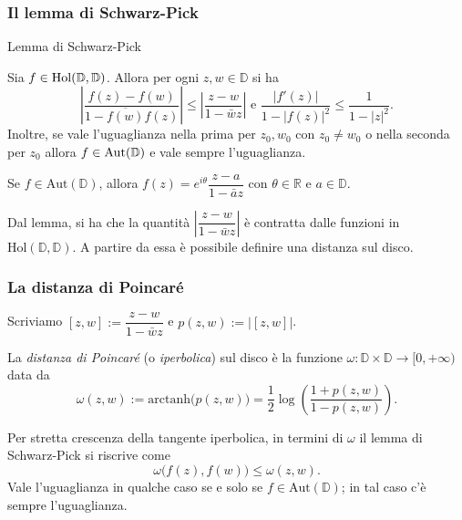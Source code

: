 \begin{frame}
  \frametitle{Il lemma di Schwarz-Pick}
  \begin{block}{Lemma di Schwarz-Pick} \label{SP}
    \begin{itshape}
      Sia $f \in \text{\normalfont{Hol}}(\mathbb{D},\mathbb{D})$. Allora per ogni $z, w \in \mathbb{D}$ si ha
      $$\left|\frac{f(z)-f(w)}{1-\overline{f(w)}f(z)}\right| \le \left|\frac{z-w}{1-\bar{w}z}\right| \text{ e } \frac{|f'(z)|}{1-|f(z)|^2} \le \frac{1}{1-|z|^2}.$$
      Inoltre, se vale l'uguaglianza nella prima per $z_0, w_0$ con $z_0 \not=w_0$ o nella seconda per $z_0$ allora $f \in \text{\normalfont{Aut}}(\mathbb{D})$ e vale sempre l'uguaglianza.
    \end{itshape}
  \end{block}
  \pause
  \begin{oss}
    Se $f \in \text{Aut}(\mathbb{D})$, allora $f(z)=e^{i\theta}\dfrac{z-a}{1-\bar{a}z}$ con $\theta \in \mathbb{R}$ e $a \in \mathbb{D}$.
  \end{oss}
  \pause
  Dal lemma, si ha che la quantità $\left|\dfrac{z-w}{1-\bar{w}z}\right|$ è contratta dalle funzioni in $\text{Hol}(\mathbb{D},\mathbb{D})$. A partire da essa è possibile definire una distanza sul disco.
\end{frame}

\begin{frame}
  \frametitle{La distanza di Poincaré}
  Scriviamo $[z,w]:=\dfrac{z-w}{1-\bar{w}z}$ e $p(z,w):=|[z,w]|$. \pause
  \begin{defn}
    La \textit{distanza di Poincaré} (o \textit{iperbolica}) sul disco è la funzione $\omega:\mathbb{D}\times \mathbb{D} \longrightarrow [0,+\infty)$ data da
    $$\omega(z,w):=\text{arctanh}\bigl(p(z,w)\bigr)=\frac{1}{2}\log\left(\frac{1+p(z,w)}{1-p(z,w)}\right).$$
  \end{defn}
  \pause
  Per stretta crescenza della tangente iperbolica, in termini di $\omega$ il lemma di Schwarz-Pick si riscrive come
  $$\omega\bigl(f(z),f(w)\bigr) \le \omega(z,w).$$
  Vale l'uguaglianza in qualche caso se e solo se $f \in \text{Aut}(\mathbb{D})$; in tal caso c'è sempre l'uguaglianza.
\end{frame}

